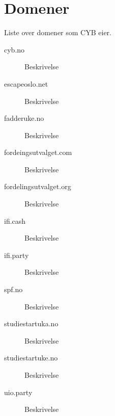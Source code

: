\chapter*{Domener}

Liste over domener som CYB eier.

\begin{description}
	\item[cyb.no] Beskrivelse
	\item[escapeoslo.net] Beskrivelse
	\item[fadderuke.no] Beskrivelse
	\item[fordeingsutvalget.com] Beskrivelse
	\item[fordelingsutvalget.org] Beskrivelse
	\item[ifi.cash] Beskrivelse
	\item[ifi.party] Beskrivelse
	\item[spf.no] Beskrivelse
	\item[studiestartuka.no] Beskrivelse
	\item[studiestartuke.no] Beskrivelse
	\item[uio.party] Beskrivelse
\end{description}
